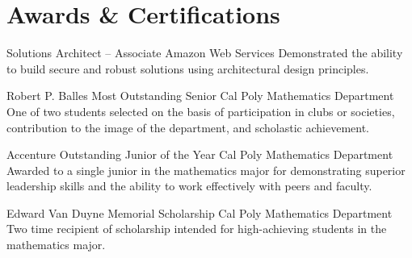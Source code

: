 \documentclass[letterpaper, 11pt, sans]{moderncv}
\begin{document}
\section{Awards \& Certifications}
        {Solutions Architect -- Associate}
        {Amazon Web Services}{}{}
        {Demonstrated the ability to build secure and robust solutions using architectural design principles.\newline}

        {Robert P. Balles Most Outstanding Senior}
        {Cal Poly Mathematics Department}{}{}
        {One of two students selected on the basis of participation in clubs or societies, contribution to the image of the department, and scholastic achievement.\newline}

        {Accenture Outstanding Junior of the Year}
        {Cal Poly Mathematics Department}{}{}
        {Awarded to a single junior in the mathematics major for demonstrating superior leadership skills and the ability to work effectively with peers and faculty.\newline}

        {Edward Van Duyne Memorial Scholarship}
        {Cal Poly Mathematics Department}{}{}
        {Two time recipient of scholarship intended for high-achieving students in the mathematics major.\newline}
\end{document}
